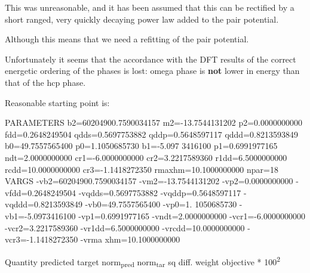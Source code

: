 \documentclass[11pt]{article}
\begin{document}
This was unreasonable, and it has been assumed that this can be rectified by a
short ranged, very quickly decaying power law added to the pair potential. 

Although this means that we need a refitting of the pair potential. 

Unfortunately it seems that the accordance with the DFT results of the
correct energetic ordering of the phases is lost: omega phase is \textbf{not}
lower in energy than that of the hcp phase.


Reasonable starting point is:

PARAMETERS
  b2=60204900.7590034157 m2=-13.7544131202 p2=0.0000000000 fdd=0.2648249504 qdds=0.5697753882 qddp=0.5648597117 qddd=0.8213593849 b0=49.7557565400 p0=1.1050685730 b1=-5.097
3416100 p1=0.6991977165 ndt=2.0000000000 cr1=-6.0000000000 cr2=3.2217589360 r1dd=6.5000000000 rcdd=10.0000000000 cr3=-1.1418272350 rmaxhm=10.1000000000 npar=18 
VARGS
    -vb2=60204900.7590034157 -vm2=-13.7544131202 -vp2=0.0000000000 -vfdd=0.2648249504 -vqdds=0.5697753882 -vqddp=0.5648597117 -vqddd=0.8213593849 -vb0=49.7557565400 -vp0=1.
1050685730 -vb1=-5.0973416100 -vp1=0.6991977165 -vndt=2.0000000000 -vcr1=-6.0000000000 -vcr2=3.2217589360 -vr1dd=6.5000000000 -vrcdd=10.0000000000 -vcr3=-1.1418272350 -vrma
xhm=10.1000000000 

Quantity      predicted    target     norm\textsubscript{pred}   norm\textsubscript{tar}    sq diff.      weight    objective * 100\textsuperscript{2} 
\end{document}
